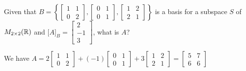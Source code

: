 \documentclass[english, 12pt]{article}
\begin{document}
\begin{exmp}
Given that $B = \left\{\begin{bmatrix} 1 & 1 \\ 0 & 2 \end{bmatrix}, \begin{bmatrix} 0 & 1 \\ 0 & 1 \end{bmatrix}, \begin{bmatrix} 1 & 2 \\ 2 & 1 \end{bmatrix}\right\}$ is a basis for a subspace $S$ of $M_{2 \times 2}({\mathbb{R}})$ and $\lbrack A \rbrack_B = \begin{bmatrix} 2 \\ -1 \\ 3 \end{bmatrix}$, what is $A$?
\begin{sol}
We have $A = 2 \begin{bmatrix} 1 & 1 \\ 0 & 2 \end{bmatrix} + (-1) \begin{bmatrix} 0 & 1 \\ 0 & 1 \end{bmatrix} + 3 \begin{bmatrix} 1 & 2 \\ 2 & 1 \end{bmatrix} = \begin{bmatrix} 5 & 7 \\ 6 & 6 \end{bmatrix}$
\end{sol}
\end{exmp}
\end{document}

